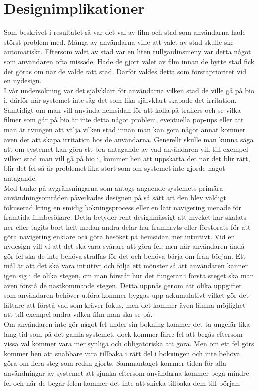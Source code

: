 \documentclass[swedish,a4paper,11pt]{article}
\begin{document}
\section{Designimplikationer}
Som beskrivet i resultatet så var det val av film och stad som användarna hade störst problem med. Många av användarna ville att valet av stad skulle ske automatiskt. Eftersom valet av stad var en liten rullgardinsmeny var detta något som användaren ofta missade. Hade de gjort valet av film innan de bytte stad fick det göras om när de valde rätt stad. Därför valdes detta som förstaprioritet vid en nydesign. \\
I vår undersökning var det självklart för användarna vilken stad de ville gå på bio i, därför när systemet inte såg det som lika självklart skapade det irritation. Samtidigt om man vill använda hemsidan för att kolla på trailers och se vilka filmer som går på bio är inte detta något problem, eventuella pop-ups eller att man är tvungen att välja vilken stad innan man kan göra något annat kommer även det att skapa irritation hos de användarna. Generellt skulle man kunna säga att om systemet kan göra ett bra antagande av vad användaren vill till exempel vilken stad man vill gå på bio i, kommer hen att uppskatta det när det blir rätt, blir det fel så är problemet lika stort som om systemet inte gjorde något antagande. \\
Med tanke på avgränsningarna som antogs angående systemets primära användningsområden påverkades designen på så sätt att den blev väldigt fokuserad kring en smidig bokningsprocess eller en lätt navigering menade för framtida filmbesökare. Detta betyder rent designmässigt att mycket har skalats ner eller tagits bort helt medan andra delar har framhävts eller förstorats för att göra navigering enklare och göra besöket på hemsidan mer intuitivt. Vid en nydesign vill vi att det ska vara svårare att göra fel, men när användaren ändå gör fel ska de inte behöva straffas för det och behöva börja om från början. Ett mål är att det ska vara intuitivt och följa ett mönster så att användaren känner igen sig i de olika stegen, om man förstår hur det fungerar i första steget ska man även förstå de nästkommande stegen. Detta uppnås genom att olika uppgifter som användaren behöver utföra kommer byggas upp ackumulativt vilket gör det lättare att förstå vad som kräver fokus, men det kommer även lämna möjlighet att till exempel ändra vilken film man ska se på.\\
Om användaren inte gör något fel under sin bokning kommer det ta ungefär lika lång tid som på det gamla systemet, dock kommer färre fel att begås eftersom vissa val kommer vara mer synliga och obligatoriska att göra. Men om ett fel görs kommer hen att snabbare vara tillbaka i rätt del i bokningen och inte behöva göra om flera steg som redan gjorts. Sammantaget kommer tiden för alla användningar av systemet att sjunka eftersom användarna kommer begå mindre fel och när de begår felen kommer det inte att skicka tillbaka dem till början. 
\end{document}
